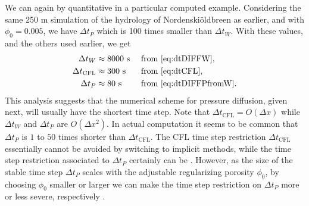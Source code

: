 \documentclass[11pt,final]{amsart}
\newcommand{\Nbreen}{Nordenski\"oldbreen\xspace}
\begin{document}
We can again by quantitative in a particular computed example.  Considering the same 250 m simulation of the hydrology of \Nbreen as earlier, and with $\phi_0 = 0.005$, we have $\Delta t_P$ which is 100 times smaller than $\Delta t_W$.  With these values, and the others used earlier, we get
\begin{align*}
  \Delta t_W            &\approx 8000 \text{ s} &&\text{ from \eqref{eq:dtDIFFW}}, \\
  \Delta t_{\text{CFL}} &\approx 300  \text{ s} &&\text{ from \eqref{eq:dtCFL}}, \\
  \Delta t_P            &\approx 80   \text{ s} &&\text{ from \eqref{eq:dtDIFFPfromW}.}
\end{align*}
This analysis suggests that the numerical scheme for pressure diffusion, given next, will usually have the shortest time step.  Note that $\Delta t_{\text{CFL}}=O(\Delta x)$ while $\Delta t_W$ and $\Delta t_P$ are $O(\Delta x^2)$.  In actual computation it seems to be common that $\Delta t_P$ is $1$ to $50$ times shorter than $\Delta t_{\text{CFL}}$.  The CFL time step restriction $\Delta t_{\text{CFL}}$ essentially cannot be avoided by switching to implicit methods, while the time step restriction associated to $\Delta t_P$ certainly can be \citep{Schoofetal2012,Hewittetal2012}.  However, as the size of the stable time step $\Delta t_P$ scales with the adjustable regularizing porosity $\phi_0$, by choosing $\phi_0$ smaller or larger we can make the time step restriction on $\Delta t_P$ more or less severe, respectively \citep[compare][]{Clarke2003}.
\end{document}
